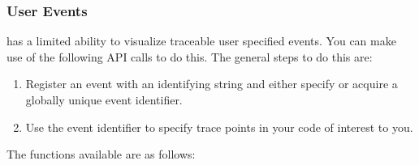 \documentclass[10pt]{article}
\begin{document}
\subsubsection{User Events}

\projections{} has a limited ability to visualize traceable user
specified events. You can make use of the following API calls to do
this. The general steps to do this are:

\begin{enumerate}
\item
Register an event with an identifying string and either specify or acquire
a globally unique event identifier.

\item
Use the event identifier to specify trace points in your code of interest to you.
\end{enumerate}

The functions available are as follows:
\end{document}
